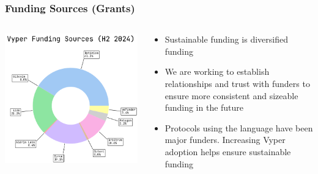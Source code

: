 \documentclass[aspectratio=169]{beamer}
\begin{document}
	\begin{frame}
		\frametitle{Funding Sources (Grants)}
		\begin{columns}[T,totalwidth=\textwidth]
			\begin{column}{0.4\textwidth}
				\includegraphics[width=\columnwidth]{charts/revenue.png}
			\end{column}
			\begin{column}{0.55\textwidth}
				\begin{itemize}
					\item Sustainable funding is diversified funding
					\vspace{0.5em}
					\item We are working to establish relationships and trust with funders to ensure more consistent and sizeable funding in the future
					\vspace{0.5em}
					\item Protocols using the language have been major funders. Increasing Vyper adoption helps ensure sustainable funding
				\end{itemize}
			\end{column}
		\end{columns}
	\end{frame}
	
\end{document}
